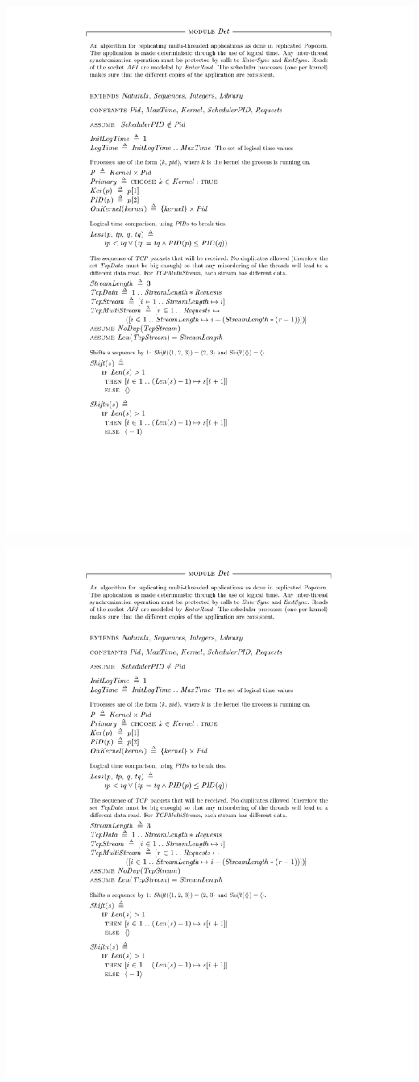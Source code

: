 \documentclass[12pt]{report}
\begin{document}
\hspace{-2.5cm}\includegraphics[page=2,scale=1]{tla/Det.pdf}

\hspace{-2.5cm}\includegraphics[page=3,scale=1]{tla/Det.pdf}
\end{document}
